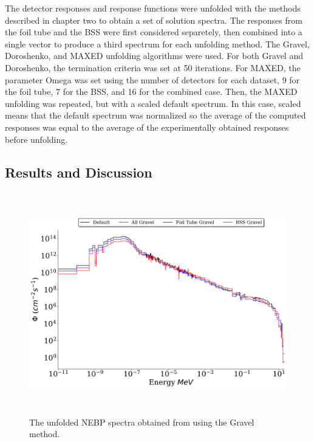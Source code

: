 The detector responses and response functions were unfolded with the methods described in chapter two to obtain a set of solution spectra.
The responses from the foil tube and the BSS were first considered separetely, then combined into a single vector to produce a third spectrum for each unfolding method.
The Gravel, Doroshenko, and MAXED unfolding algorithms were used.
For both Gravel and Doroshenko, the termination criteria was set at 50 iterations.
For MAXED, the parameter Omega was set using the number of detectors for each dataset, 9 for the foil tube, 7 for the BSS, and 16 for the combined case.
Then, the MAXED unfolding was repeated, but with a scaled default spectrum.
In this case, scaled means that the default spectrum was normalized so the average of the computed responses was equal to the average of the experimentally obtained responses before unfolding.

\subsection{Results and Discussion}


\begin{figure}[htb]
\includegraphics[height=3.8in]{tex/figures/unfolded_gr.png}
\caption[Gravel Unfolded Spectra]{The unfolded NEBP spectra obtained from using the Gravel method.}
\label{fig:unfolded_gr}
\end{figure}

